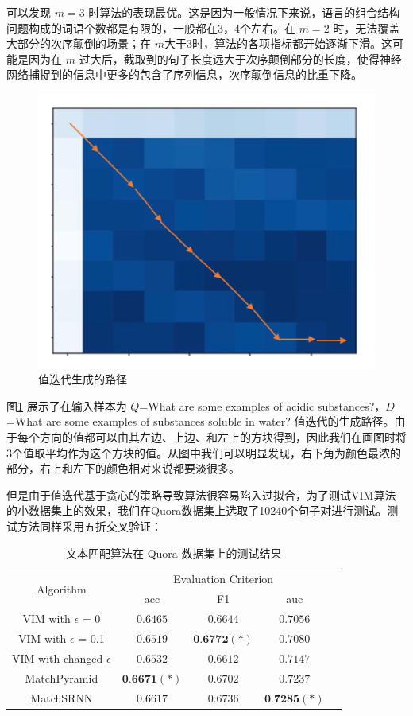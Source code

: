 可以发现 $m=3$ 时算法的表现最优。这是因为一般情况下来说，语言的组合结构问题构成的词语个数都是有限的，一般都在3，4个左右。在 $m=2$ 时，无法覆盖大部分的次序颠倒的场景；在 $m$大于3时，算法的各项指标都开始逐渐下滑。这可能是因为在 $m$ 过大后，截取到的句子长度远大于次序颠倒部分的长度，使得神经网络捕捉到的信息中更多的包含了序列信息，次序颠倒信息的比重下降。
\begin{figure}[!htbp]
\vspace{1em}
\centering
  \includegraphics[width=0.5\linewidth]{figures/val_iter_path}
  \caption{值迭代生成的路径}
  \label{fig:val_iter_path}       %
\vspace{1em}
\end{figure}

图\ref{fig:val_iter_path} 展示了在输入样本为 $Q$=What are some examples of acidic substances?，$D$=What are some examples of substances soluble in water? 值迭代的生成路径。由于每个方向的值都可以由其左边、上边、和左上的方块得到，因此我们在画图时将3个值取平均作为这个方块的值。从图中我们可以明显发现，右下角为颜色最浓的部分，右上和左下的颜色相对来说都要淡很多。

但是由于值迭代基于贪心的策略导致算法很容易陷入过拟合，为了测试VIM算法的小数据集上的效果，我们在Quora数据集上选取了10240个句子对进行测试。测试方法同样采用五折交叉验证：
\begin{table}[htbp]
\caption{文本匹配算法在 Quora 数据集上的测试结果}\label{tab:MDP_small_test}
\vspace{0.5em}\centering\wuhao
\begin{tabular}{ccccc}
\toprule[1.5pt]
	\multirow{2}{*}{Algorithm} &
        \multicolumn{3}{c}{\multirow{1}{*}{Evaluation Criterion}} \\
        \cline{2-4} & acc & F1 & auc \\
        \hline
        VIM with $\epsilon$ = 0 & $0.6465$ & $0.6644$ & $0.7056$ \\
        VIM with $\epsilon$ = 0.1 & $0.6519$ & $\textbf{0.6772}(*)$ & $0.7080$ \\
        VIM with changed $\epsilon$ & $0.6532$ & $0.6612$ & $0.7147$ \\
        \hline
        MatchPyramid & $\textbf{0.6671}(*)$ & $0.6702$ & $0.7237$ \\
        \hline
        MatchSRNN & $0.6617$ & $0.6736$ & $\textbf{0.7285}(*)$\\
        \bottomrule[1.5pt]
\end{tabular}
\vspace{\baselineskip}
\end{table}

